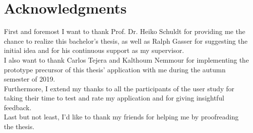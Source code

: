 \chapter{Acknowledgments}


First and foremost I want to thank Prof. Dr. Heiko Schuldt for providing me the chance to realize this bachelor's thesis, as well as Ralph Gasser for suggesting the initial idea and for his continuous support as my supervisor.\\
I also want to thank Carlos Tejera and Kalthoum Nemmour for implementing the prototype precursor of this thesis' application with me during the autumn semester of 2019.\\
Furthermore, I extend my thanks to all the participants of the user study for taking their time to test and rate my application and for giving insightful feedback.\\
Last but not least, I'd like to thank my friends for helping me by proofreading the thesis.